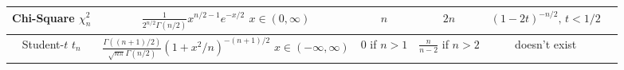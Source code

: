 \begin{center}
\begin{tabular}{cccccc}
          \hline
          \shortstack{Chi-Square                                                                                            \\ $\chi_n^2$} & \shortstack{$\frac{1}{2^{n/2}\Gamma(n/2)}x^{n/2 - 1}e^{-x/2}$\\$x \in (0, \infty) $} & $n$  & $2n$ & $(1 - 2t)^{-n/2}, \, t < 1/2$\\
          \hline
          \shortstack{Student-$t$                                                                                           \\ $t_n$} & \shortstack{$\frac{\Gamma((n+1)/2)}{\sqrt{n\pi} \Gamma(n/2)} (1+x^2/n)^{-(n+1)/2}$\\$x \in (-\infty, \infty)$} & $0$ if $n>1$ & $\frac{n}{n-2}$ if $n>2$ & doesn't exist\\
          \hline
     \end{tabular}
\end{center}
\clearpage
\resumecol